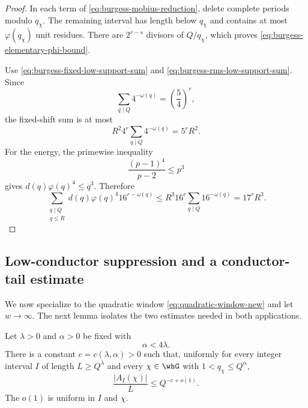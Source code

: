 \begin{proof}
In each term of \eqref{eq:burgess-mobius-reduction}, delete complete periods
modulo $q_\chi$.  The remaining interval has length below $q_\chi$ and
contains at most $\varphi(q_\chi)$ unit residues.  There are
$2^{r-s}$ divisors of $Q/q_\chi$, which proves
\eqref{eq:burgess-elementary-phi-bound}.

Use \eqref{eq:burgess-fixed-low-support-sum} and
\eqref{eq:burgess-rms-low-support-sum}.  Since
\[
 \sum_{q\mid Q}4^{-\omega(q)}=\left(\frac54\right)^r,
\]
the fixed-shift sum is at most
\[
 R^2 4^r\sum_{q\mid Q}4^{-\omega(q)}=5^rR^2.
\]
For the energy, the primewise inequality
\[
 \frac{(p-1)^4}{p-2}\le p^3
\]
gives $d(q)\varphi(q)^4\le q^3$.  Therefore
\[
 \sum_{\substack{q\mid Q\\q\le R}}
 d(q)\varphi(q)^4 16^{r-\omega(q)}
 \le R^3 16^r\sum_{q\mid Q}16^{-\omega(q)}
 =17^rR^3.
\]
\end{proof}

\subsection{Low-conductor suppression and a conductor-tail estimate}
\label{subsec:burgess-conductor-suppression}

We now specialize to the quadratic window \eqref{eq:quadratic-window-new} and
let $w\to\infty$.  The next lemma isolates the two estimates needed in both
applications.

\begin{lemma}
\label{lem:burgess-power-cutoff-suppression}
Let $\lambda>0$ and $\alpha>0$ be fixed with
\begin{equation}\label{eq:burgess-low-cutoff-condition}
 \alpha<4\lambda.
\end{equation}
There is a constant $c=c(\lambda,\alpha)>0$ such that, uniformly for every
integer interval $I$ of length $L\ge Q^\lambda$ and every
$\chi\in\whG$ with $1<q_\chi\le Q^\alpha$,
\begin{equation}\label{eq:burgess-uniform-low-suppression}
 \frac{|A_I(\chi)|}{L}\le Q^{-c+o(1)}.
\end{equation}
The $o(1)$ is uniform in $I$ and $\chi$.
\end{lemma}

